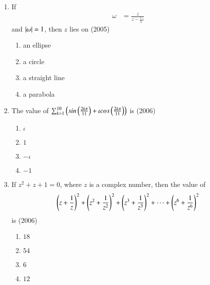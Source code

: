\documentclass[journal,12pt,twocolumn]{IEEEtran}
\theoremstyle{remark}
\begin{document}
\begin{enumerate}
	\item{If \begin{align*} \omega &= \frac{z}{z-\frac{1}{3}\iota} \end{align*} and $\left\vert\omega\right\vert = 1$, then $z$ lies on \hfill (2005)
		\begin{multicols}{2}
		\begin{enumerate}
			\item{an ellipse}
			\item{a circle}
			\columnbreak
			\item{a straight line}
			\item{a parabola}
		\end{enumerate}
		\end{multicols}}

	\item{The value of $\sum_{k=1}^{10}\left(sin\left(\frac{2k\pi}{11}\right)+\iota cos\left(\frac{2k\pi}{11}\right)\right)$ is 
		\hfill (2006)
		\begin{multicols}{4}
		\begin{enumerate}
			\item{$\iota$}
			\columnbreak
			\item{$1$}
			\columnbreak
			\item{$-\iota$}
			\columnbreak
			\item{$-1$}
		\end{enumerate}
		\end{multicols}}

	\item{If $z^2 + z + 1 = 0$, where $z$ is a complex number, then the value of $$\left(z+\frac{1}{z}\right)^2 + \left(z^2+\frac{1}{z^2}\right)^2 +\left(z^3+ \frac{1}{z^3}\right)^2 + \dots + \left(z^6+\frac{1}{z^6}\right)^2 $$ is \hfill (2006)
		\begin{multicols}{4}
		\begin{enumerate}
			\item{$18$}
			\columnbreak
			\item{$54$}
			\columnbreak
			\item{$6$}
			\columnbreak
			\item{$12$}
		\end{enumerate}
		\end{multicols}}

\end{enumerate}
\end{document}

